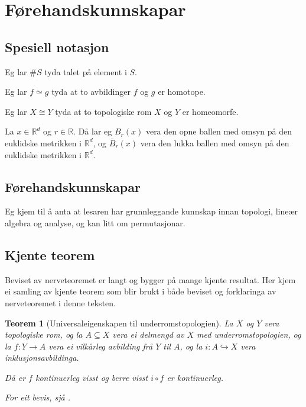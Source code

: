 \documentclass[a4paper, 12pt, norsk]{article}
\theoremstyle{plain}
\newtheorem{theorem}{Teorem}[section]
\theoremstyle{definition}
\newcommand{\Rb}{\mathbb{R}}
\begin{document}
\section{Førehandskunnskapar}

\subsection{Spesiell notasjon}
 
Eg lar \( \#S \) tyda talet på element i \( S \).

Eg lar \( f \simeq  g \) tyda at to avbildinger \( f \) og \( g \) er homotope.

Eg lar \( X \cong Y \) tyda at to topologiske rom \( X \) og \( Y \) er homeomorfe.

La \( x \in \Rb^d \) og \( r \in \Rb \). Då lar eg \( B_r(x) \) vera den opne ballen med omsyn på den euklidske metrikken i \( \Rb^d \), og \( \bar{B}_r(x) \) vera den lukka ballen med omsyn på den euklidske metrikken i \( \Rb^d \).

\subsection{Førehandskunnskapar}

Eg kjem til å anta at lesaren har grunnleggande kunnskap innan topologi, lineær algebra og analyse, og kan litt om permutasjonar.

\subsection{Kjente teorem}

Beviset av nerveteoremet er langt og bygger på mange kjente resultat. Her kjem ei samling av kjente teorem som blir brukt i både beviset og forklaringa av nerveteoremet i denne teksten.

\begin{theorem}[Universaleigenskapen til underromstopologien] \label{thm:universal-eigenskap-underromstopologi}
	La \( X \) og \( Y \) vera topologiske rom, og la \( A \subseteq X \) vera ei delmengd av \( X \) med underromstopologien, og la \( f: Y \to A \) vera ei vilkårleg avbilding frå \( Y \) til \( A \), og la \( i: A \hookrightarrow X \) vera inklusjonsavbildinga. 
	
	Då er \( f \) kontinuerleg visst og berre visst \( i \circ f \) er kontinuerleg.

	For eit bevis, sjå \cite[s. 98]{MR2548039}.
\end{theorem}
\end{document}
